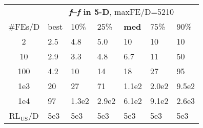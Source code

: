 \begin{tabular}{c|llllll}
 & \multicolumn{6}{|c}{\textbf{\textit{f}\raisebox{-0.35ex}{1}--\textit{f}\raisebox{-0.35ex}{24} in 5-D}, maxFE/D=5210}\\
\#FEs/D & best & 10\% & 25\% & \textbf{med} & 75\% & 90\%\\
2 & \hspace*{1ex}2.5 & \hspace*{1ex}4.8 & \hspace*{1ex}5.0 & 10 & 10 & 10\\
10 & \hspace*{1ex}2.9 & \hspace*{1ex}3.3 & \hspace*{1ex}4.8 & \hspace*{1ex}6.7 & 11 & 50\\
100 & \hspace*{1ex}4.2 & 10 & 14 & 18 & 27 & 95\\
1e3 & 20 & 27 & 71 & 1.1e2 & 2.0e2 & 9.5e2\\
1e4 & 97 & 1.3e2 & 2.9e2 & 6.1e2 & 9.1e2 & 2.6e3\\
$\text{RL}_{\text{US}}$/D & 5e3 & 5e3 & 5e3 & 5e3 & 5e3 & 5e3
\end{tabular}
